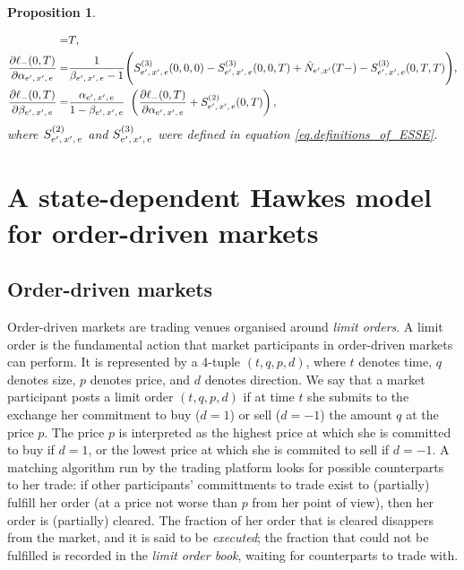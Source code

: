 \documentclass[10pt]{article}
\newtheorem{prop}[thm]{Proposition}
\begin{document}
\begin{prop}
\begin{itemize}
\begin{equation}
\begin{split}
   =&
   T,
   \\
   \frac{\partial\ell_{-}(0,T)}{\partial\alpha_{e^{\prime},\, x^{\prime},\, e}}
   =&
   \frac{1}{\beta_{e^{\prime},\, x^{\prime},\, e} - 1}
   \Bigg(
   S^{(3)}_{e^{\prime},\, x^{\prime},\, e}(0,0,0)  - S^{(3)}_{e^{\prime},\, x^{\prime},\, e}(0,0,T)
    +\tilde{N}_{e^{\prime},x^{\prime}}(T-)
   - S^{(3)}_{e^{\prime},\, x^{\prime},\, e}(0,T,T)
   \Bigg),
   \\
   \frac{\partial\ell_{-}(0,T)}{\partial\beta_{e^{\prime},\, x^{\prime},\, e}}
   =&
   \frac{\alpha_{e^{\prime},\, x^{\prime},\, e}}{1-\beta_{e^{\prime},\, x^{\prime},\, e}}\
   \left(
   \frac{\partial\ell_{-}(0,T)}{\partial\alpha_{e^{\prime},\, x^{\prime},\, e}}
   +S^{(2)}_{e^{\prime},\, x^{\prime},\, e}(0,T)
   \right),
  \end{split}
 \end{equation}
 where $S^{(2)}_{e^{\prime},\, x^{\prime},\, e}$ and $S^{(3)}_{e^{\prime},\, x^{\prime},\, e}$ were defined in equation \eqref{eq.definitions_of_ESSE}.
 \end{itemize}
\end{prop}

\section{A state-dependent Hawkes model for order-driven markets}

\subsection{Order-driven markets}\label{sec.order-driven_markets}
Order-driven markets are trading venues organised around \emph{limit orders}. A limit order is the fundamental action that market participants in order-driven markets can perform. It is represented by a 4-tuple $(t,q,p,d)$, where $t$ denotes time, $q$ denotes size, $p$ denotes price, and $d$ denotes direction. We say that a market participant posts a limit order $(t,q,p,d)$ if at time $t$ she submits to the exchange her commitment to buy ($d=1$) or sell ($d=-1$) the amount $q$ at the price $p$. The price $p$ is interpreted as the highest price at which she is committed to buy if $d=1$, or the lowest price at which she is commited to sell if $d=-1$. A matching algorithm run by the trading platform looks for possible counterparts to her trade: if other participants' committments to trade exist to (partially) fulfill her order (at a price not worse than $p$ from her point of view), then her order is (partially) cleared. The fraction of her order that is cleared disappers from the market, and it is said to be \emph{executed};  the fraction that could not be fulfilled is recorded in the \emph{limit order book}, waiting for counterparts to trade with.
\end{document}
